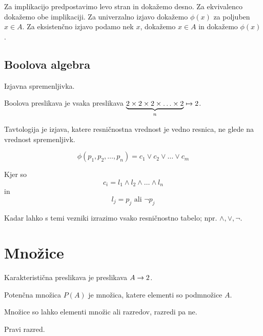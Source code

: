 
Za implikacijo predpostavimo levo stran in dokažemo desno. Za ekvivalenco dokažemo obe implikaciji. Za univerzalno izjavo dokažemo $\phi(x)$ za poljuben $x \in A$. Za eksistenčno izjavo podamo nek $x$, dokažemo $x \in A$ in dokažemo $\phi(x)$.

\subsection{Boolova algebra}


Izjavna spremenljivka.

Boolova preslikava je vsaka preslikava $\underbrace{2 \times 2 \times 2 \times \ldots \times 2}_n \mapsto 2$.

Tavtologija je izjava, katere resničnostna vrednost je vedno resnica, ne glede na vrednost spremenljivk.


\[
	\phi(p_1,p_2,\ldots,p_n) = c_1 \lor c_2 \lor \ldots \lor c_m
\]

Kjer so \[
	c_i = l_1 \land l_2 \land \ldots \land l_n
\]
in \[
	l_j = p_j \text{ ali } \lnot p_j
\]


Kadar lahko s temi vezniki izrazimo vsako resničnostno tabelo; npr. $\land, \lor, \lnot$.

\section{Množice}


Karakteristična preslikava je preslikava $A \to 2$.

Potenčna množica $P(A)$ je množica, katere elementi so podmnožice $A$.


Množice so lahko elementi množic ali razredov, razredi pa ne.

Pravi razred.


